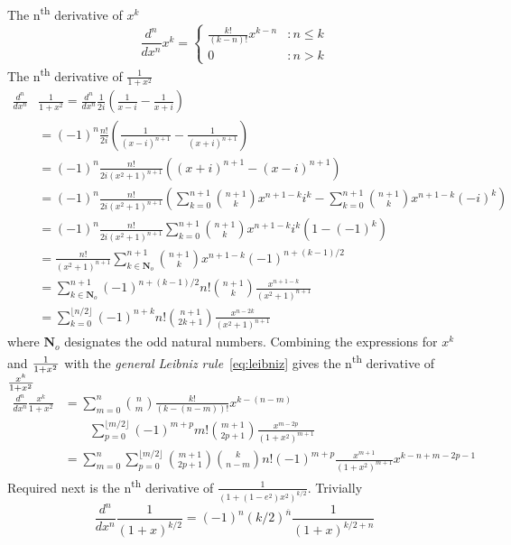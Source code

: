 \documentclass[a4paper]{amsart}
\begin{document}
The n\textsuperscript{th} derivative of $x^k$
\begin{equation*}
\frac{d^n}{dx^n}x^k =
\begin{cases}
\frac{k!}{(k-n)!}x^{k-n} & :n\leq k \\
0 & :n > k
\end{cases}
\end{equation*}
The n\textsuperscript{th} derivative of $\frac{1}{1+x^2}$
\begin{align*}
\frac{d^n}{dx^n}&\frac{1}{1+x^2} = \frac{d^n}{dx^n}\frac{1}{2i}\left(\frac{1}{x-i} - \frac{1}{x+i}\right)\\
&=(-1)^n\frac{n!}{2i}\left(\frac{1}{(x-i)^{n+1}} - \frac{1}{(x+i)^{n+1}}\right)\\
&=(-1)^n\frac{n!}{2i(x^2 + 1)^{n+1}}\left((x+i)^{n+1}-(x-i)^{n+1}\right)\\
&=(-1)^n\frac{n!}{2i(x^2 + 1)^{n+1}}\left(\sum^{n+1}_{k=0}\binom{n+1}{k}x^{n+1-k}i^k - \sum^{n+1}_{k=0}\binom{n+1}{k}x^{n+1-k}(-i)^k\right)\\
&=(-1)^n\frac{n!}{2i(x^2 + 1)^{n+1}}\sum^{n+1}_{k=0}\binom{n+1}{k}x^{n+1-k}i^k\left(1 - (-1)^k\right)\\
&=\frac{n!}{(x^2 + 1)^{n+1}}\sum^{n+1}_{k\in\mathbf{N}_o}\binom{n+1}{k}x^{n+1-k}(-1)^{n+(k-1)/2}\\
&=\sum^{n+1}_{k\in\mathbf{N}_o}(-1)^{n+(k-1)/2}n!\binom{n+1}{k}\frac{x^{n+1-k}}{(x^2 + 1)^{n+1}}\\
&=\sum^{\lfloor n/2\rfloor}_{k=0}(-1)^{n+k}n!\binom{n+1}{2k+1}\frac{x^{n-2k}}{(x^2 + 1)^{n+1}}
\end{align*}
where $\mathbf{N}_o$ designates the odd natural numbers.
%
Combining the expressions for $x^k$ and $\tfrac{1}{\smash{1+x^{{}_2}}}$ with the \emph{general Leibniz rule}~\eqref{eq:leibniz} gives the n\textsuperscript{th} derivative of $\tfrac{\smash{x^k}}{\smash{1+x^{{}_2}}}$
\begin{align*}
\frac{d^n}{dx^n}\frac{x^k}{1+x^2} &= \sum^n_{m=0}\binom{n}{m}\frac{k!}{(k-(n-m))!}x^{k-(n-m)}\\
&\quad\quad\sum^{\lfloor m/2\rfloor}_{p=0}(-1)^{m+p}m!\binom{m+1}{2p+1}\frac{x^{m-2p}}{(1 + x^2)^{m+1}}\\
& = \sum^n_{m=0}\sum^{\lfloor m/2\rfloor}_{p=0}\binom{m+1}{2p+1}\binom{k}{n-m}n!(-1)^{m+p}\frac{x^{m+1}}{(1 + x^2)^{m+1}}x^{k-n+m-2p-1}
\end{align*}
%
Required next is the n\textsuperscript{th} derivative of $\frac{1}{(1+(1-e^2)x^2)^{k/2}}$.
Trivially
\begin{equation*}
\frac{d^n}{dx^n}\frac{1}{(1+x)^{k/2}} = (-1)^n(k/2)^{\overline{n}}\frac{1}{(1+x)^{k/2+n}}
\end{equation*}
\end{document}
